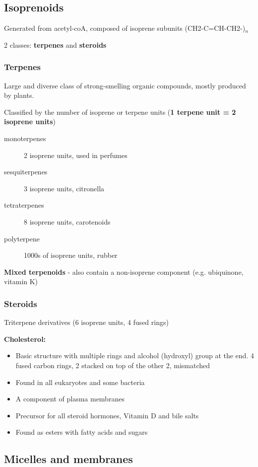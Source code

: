 \documentclass[letterpaper, 12pt]{article}
\begin{document}
\subsection*{Isoprenoids}
Generated from acetyl-coA, composed of isoprene subunits (CH2-C=CH-CH2-)$_n$

2 classes: \textbf{terpenes} and \textbf{steroids}

\subsubsection*{Terpenes}
Large and diverse class of strong-smelling organic compounds, mostly produced by plants.

Classified by the number of isoprene or terpene units (\textbf{1 terpene unit = 2 isoprene units})

\begin{description}
\item [monoterpenes] 2 isoprene units, used in perfumes
\item [sesquiterpenes] 3 isoprene units, citronella
\item [tetraterpenes] 8 isoprene units, carotenoids
\item [polyterpene] 1000s of isoprene units, rubber
\end{description}

\textbf{Mixed terpenoids} - also contain a non-isoprene component (e.g. ubiquinone, vitamin K)

\subsubsection*{Steroids}
Triterpene derivatives (6 isoprene units, 4 fused rings)

\textbf{Cholesterol:}
\begin{itemize}
\item Basic structure with multiple rings and alcohol (hydroxyl) group at the end. 4 fused carbon rings, 2 stacked on top of the other 2, mismatched
\item Found in all eukaryotes and some bacteria
\item A component of plasma membranes
\item Precursor for all steroid hormones, Vitamin D and bile salts
\item Found as esters with fatty acids and sugars
\end{itemize}

\subsection*{Micelles and membranes}
\end{document}
